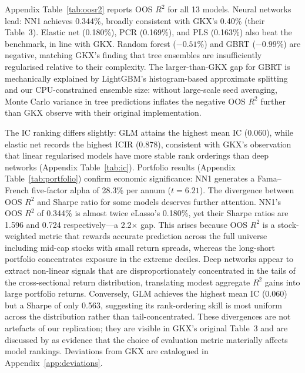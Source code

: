\documentclass[11pt,a4paper]{article}
\begin{document}
Appendix Table~\ref{tab:oosr2} reports OOS $R^2$ for all 13 models. Neural networks lead: NN1 achieves 0.344\%, broadly consistent with GKX's 0.40\% (their Table~3). Elastic net (0.180\%), PCR (0.169\%), and PLS (0.163\%) also beat the benchmark, in line with GKX. Random forest ($-0.51\%$) and GBRT ($-0.99\%$) are negative, matching GKX's finding that tree ensembles are insufficiently regularised relative to their complexity. The larger-than-GKX gap for GBRT is mechanically explained by LightGBM's histogram-based approximate splitting and our CPU-constrained ensemble size: without large-scale seed averaging, Monte Carlo variance in tree predictions inflates the negative OOS $R^2$ further than GKX observe with their original implementation.

The IC ranking differs slightly: GLM attains the highest mean IC (0.060), while elastic net records the highest ICIR (0.878), consistent with GKX's observation that linear regularised models have more stable rank orderings than deep networks (Appendix Table~\ref{tab:ic}). Portfolio results (Appendix Table~\ref{tab:portfolio}) confirm economic significance: NN1 generates a Fama--French five-factor \citep{FamaFrench2015} alpha of 28.3\% per annum ($t = 6.21$). The divergence between OOS $R^2$ and Sharpe ratio for some models deserves further attention. NN1's OOS $R^2$ of 0.344\% is almost twice eLasso's 0.180\%, yet their Sharpe ratios are 1.596 and 0.724 respectively---a 2.2$\times$ gap. This arises because OOS $R^2$ is a stock-weighted metric that rewards accurate prediction across the full universe including mid-cap stocks with small return spreads, whereas the long-short portfolio concentrates exposure in the extreme deciles. Deep networks appear to extract non-linear signals that are disproportionately concentrated in the tails of the cross-sectional return distribution, translating modest aggregate $R^2$ gains into large portfolio returns. Conversely, GLM achieves the highest mean IC (0.060) but a Sharpe of only 0.563, suggesting its rank-ordering skill is most uniform across the distribution rather than tail-concentrated. These divergences are not artefacts of our replication; they are visible in GKX's original Table~3 and are discussed by \citet{GKX2020} as evidence that the choice of evaluation metric materially affects model rankings. Deviations from GKX are catalogued in Appendix~\ref{app:deviations}.

\end{document}
